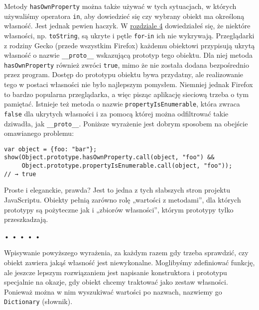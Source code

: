   
Metody \texttt{hasOwnProperty} można także używać w tych sytuacjach, w których używaliśmy operatora \texttt{in}, aby dowiedzieć się czy wybrany obiekt ma określoną własność. Jest jednak pewien haczyk. W \hyperref[chap:4]{rozdziale 4} dowiedziałeś się, że niektóre własności, np. \texttt{toString}, są ukryte i pętle \texttt{for}-\texttt{in} ich nie wykrywają. Przeglądarki z rodziny Gecko (przede wszystkim Firefox) każdemu obiektowi przypisują ukrytą własność o nazwie \texttt{\_\_proto\_\_} wskazującą prototyp tego obiektu. Dla niej metoda \texttt{hasOwnProperty} również zwróci \texttt{true}, mimo że nie została dodana bezpośrednio przez program. Dostęp do prototypu obiektu bywa przydatny, ale realizowanie tego w postaci własności nie było najlepszym pomysłem. Niemniej jednak Firefox to bardzo popularna przeglądarka, a więc pisząc aplikację sieciową trzeba o tym pamiętać. Istnieje też metoda o nazwie \texttt{propertyIsEnumerable}, która zwraca \texttt{false} dla ukrytych własności i za pomocą której można odfiltrować takie dziwadła, jak \texttt{\_\_proto\_\_}. Poniższe wyrażenie jest dobrym sposobem na obejście omawianego problemu:

  
\begin{verbatim} 
var object = {foo: "bar"};
show(Object.prototype.hasOwnProperty.call(object, "foo") &&
     Object.prototype.propertyIsEnumerable.call(object, "foo"));
// → true
\end{verbatim}
  
Proste i eleganckie, prawda? Jest to jedna z tych słabszych stron projektu JavaScriptu. Obiekty pełnią zarówno rolę „wartości z metodami”, dla których prototypy są pożyteczne jak i „zbiorów własności”, którym prototypy tylko przeszkadzają.



\begin{center}
• • • • •
\end{center}

  
Wpisywanie powyższego wyrażenia, za każdym razem gdy trzeba sprawdzić, czy obiekt zawiera jakąś własność jest niewykonalne. Moglibyśmy zdefiniować funkcję, ale jeszcze lepszym rozwiązaniem jest napisanie konstruktora i prototypu specjalnie na okazje, gdy obiekt chcemy traktować jako zestaw własności. Ponieważ można w nim wyszukiwać wartości po nazwach, nazwiemy go \texttt{Dictionary} (słownik).

